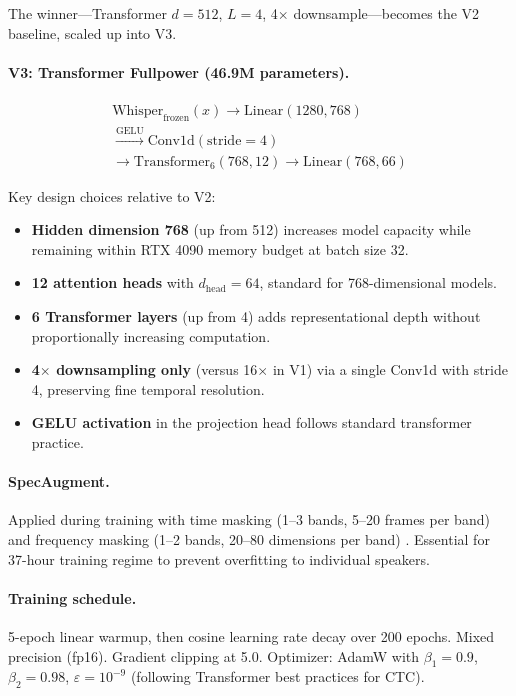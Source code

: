 \documentclass[11pt]{article}
\begin{document}
The winner---Transformer $d{=}512$, $L{=}4$, 4$\times$ downsample---becomes the V2 baseline, scaled up into V3.

\paragraph{V3: Transformer Fullpower (46.9M parameters).}
\begin{multline}
\text{Whisper}_{\text{frozen}}(x) \to \text{Linear}(1280, 768) \\
\xrightarrow{\text{GELU}} \text{Conv1d}(\text{stride}{=}4) \\
\to \text{Transformer}_6(768, 12) \to \text{Linear}(768, 66)
\end{multline}

Key design choices relative to V2:
\begin{itemize}
\item \textbf{Hidden dimension 768} (up from 512) increases model capacity while remaining within RTX 4090 memory budget at batch size 32.
\item \textbf{12 attention heads} with $d_\text{head} = 64$, standard for 768-dimensional models.
\item \textbf{6 Transformer layers} (up from 4) adds representational depth without proportionally increasing computation.
\item \textbf{4$\times$ downsampling only} (versus 16$\times$ in V1) via a single Conv1d with stride 4, preserving fine temporal resolution.
\item \textbf{GELU activation} in the projection head follows standard transformer practice.
\end{itemize}

\paragraph{SpecAugment.}
Applied during training with time masking (1--3 bands, 5--20 frames per band) and frequency masking (1--2 bands, 20--80 dimensions per band) \cite{park2019specaugment}.
Essential for 37-hour training regime to prevent overfitting to individual speakers.

\paragraph{Training schedule.}
5-epoch linear warmup, then cosine learning rate decay over 200 epochs.
Mixed precision (fp16).
Gradient clipping at 5.0.
Optimizer: AdamW with $\beta_1{=}0.9$, $\beta_2{=}0.98$, $\varepsilon{=}10^{-9}$ (following Transformer best practices for CTC).
\end{document}
